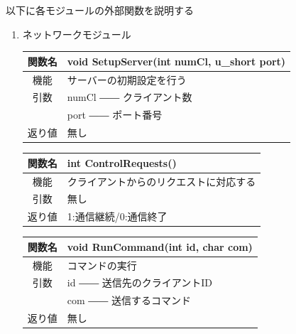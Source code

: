 \documentclass{jarticle}
\begin{document}
以下に各モジュールの外部関数を説明する
\begin{enumerate}
    \item ネットワークモジュール
    \begin{table}[H]
        \label{table:fanc_s1-1}
        \begin{center}
            \begin{tabular}{|c||p{30em}|}\hline
                関数名&void SetupServer(int numCl, u\_short port)\\\hline
                機能&サーバーの初期設定を行う\\
                引数&numCl ―― クライアント数\\
                &port ―― ポート番号\\
                返り値&無し\\\hline
            \end{tabular}
        \end{center}
    \end{table}
    \begin{table}[H]
        \label{table:fanc_s1-2}
        \begin{center}
            \begin{tabular}{|c||p{30em}|}\hline
                関数名&int ControlRequests() \\\hline
                機能&クライアントからのリクエストに対応する\\
                引数&無し\\
                返り値&1:通信継続/0:通信終了\\\hline
            \end{tabular}
        \end{center}
    \end{table}
    \begin{table}[H]
        \label{table:fanc_s1-3}
        \begin{center}
            \begin{tabular}{|c||p{30em}|}\hline
                関数名&void RunCommand(int id, char com) \\\hline
                機能&コマンドの実行\\
                引数&id ―― 送信先のクライアントID\\
                &com ―― 送信するコマンド\\
                返り値&無し\\\hline
            \end{tabular}
        \end{center}

\end{table}
\end{enumerate}
\end{document}
